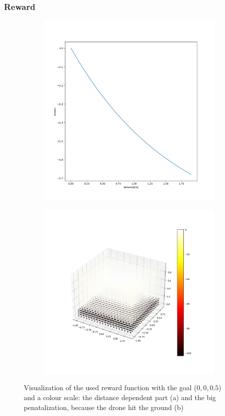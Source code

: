 \subsubsection{Reward}
\begin{figure}
	\centering
	\begin{subfigure}{0.45\linewidth}
		\includegraphics[width=\linewidth]{figures/reward.png}
		\caption{}
	\end{subfigure}
	\begin{subfigure}{0.45\linewidth}
		\includegraphics[width=\linewidth]{figures/reward2.png}
		\caption{}
	\end{subfigure}
	\caption{Visualization of the used reward function with the goal ($0,0,0.5$) and a colour scale: the distance dependent part (a) and the big penatalization, because the drone hit the ground (b)}
\end{figure}

